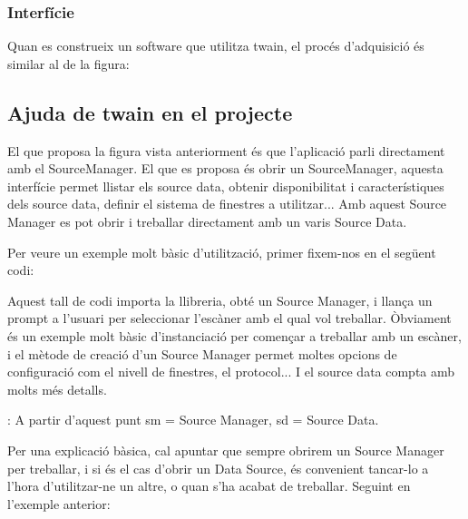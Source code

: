 \documentclass[letterpaper,11pt,catalan]{sphinxmanual}
\begin{document}
\subsubsection{Interfície}
\label{\detokenize{index:interficie}}
Quan es construeix un software que utilitza twain, el procés d'adquisició és similar al
de la figura:



\subsection{Ajuda de twain en el projecte}
\label{\detokenize{index:ajuda-de-twain-en-el-projecte}}
El que proposa la figura vista anteriorment és que l'aplicació parli directament amb el SourceManager. El
que es proposa és obrir un SourceManager, aquesta interfície permet llistar els source data, obtenir
disponibilitat i característiques dels source data, definir el sistema de finestres a utilitzar... Amb
aquest Source Manager es pot obrir i treballar directament amb un varis Source Data.

Per veure un exemple molt bàsic d'utilització, primer fixem-nos en el següent codi:

\begin{sphinxVerbatim}[commandchars=\\\{\}]
 
  
  
\end{sphinxVerbatim}

Aquest tall de codi importa la llibreria, obté un Source Manager, i llança un prompt a l'usuari
per seleccionar l'escàner amb el qual vol treballar. Òbviament és un exemple molt bàsic \sphinxquotedblleft{}d'instanciació\sphinxquotedblright{}
per començar a treballar amb un escàner, i el mètode de creació d'un Source Manager permet moltes opcions
de configuració com el nivell de finestres, el protocol... I el source data compta amb molts més detalls.

: A partir d'aquest punt sm = Source Manager, sd = Source Data.

Per una explicació bàsica, cal apuntar que sempre obrirem un Source Manager per treballar, i si és el cas
d'obrir un Data Source, és convenient tancar-lo a l'hora d'utilitzar-ne un altre, o quan s'ha acabat
de treballar. Seguint en l'exemple anterior:
\end{document}

